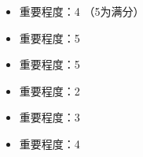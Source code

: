 \documentclass[letterpaper,10pt,english]{sphinxmanual}
\begin{document}
\sphinxAtStartPar
{}
\begin{itemize}
\item {} \begin{description}
\sphinxAtStartPar
重要程度：4 （5为满分）

\end{description}

\item {} \begin{description}
\sphinxAtStartPar
重要程度：5

\end{description}

\item {} \begin{description}
\sphinxAtStartPar
重要程度：5

\end{description}

\item {} \begin{description}
\sphinxAtStartPar
重要程度：2

\end{description}

\item {} \begin{description}
\sphinxAtStartPar
重要程度：3

\end{description}

\item {} \begin{description}
\sphinxAtStartPar
重要程度：4

\end{description}

\end{itemize}

\sphinxAtStartPar
{}

\sphinxstepscope
\end{document}
